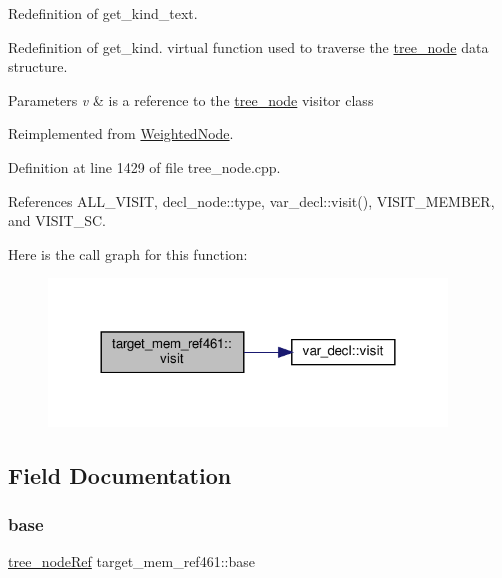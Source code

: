Redefinition of get\+\_\+kind\+\_\+text. 

Redefinition of get\+\_\+kind. virtual function used to traverse the \hyperlink{classtree__node}{tree\+\_\+node} data structure. 
\begin{DoxyParams}{Parameters}
{\em v} & is a reference to the \hyperlink{classtree__node}{tree\+\_\+node} visitor class \\
\hline
\end{DoxyParams}


Reimplemented from \hyperlink{structWeightedNode_a6f976feccb640a60f96475a668314fde}{Weighted\+Node}.



Definition at line 1429 of file tree\+\_\+node.\+cpp.



References A\+L\+L\+\_\+\+V\+I\+S\+IT, decl\+\_\+node\+::type, var\+\_\+decl\+::visit(), V\+I\+S\+I\+T\+\_\+\+M\+E\+M\+B\+ER, and V\+I\+S\+I\+T\+\_\+\+SC.

Here is the call graph for this function\+:
\nopagebreak
\begin{figure}[H]
\begin{center}
\leavevmode
\includegraphics[width=300pt]{dd/d30/structtarget__mem__ref461_af45ee8b7f6831742eb9108a5987d871e_cgraph}
\end{center}
\end{figure}


\subsection{Field Documentation}
\mbox{\label{structtarget__mem__ref461_af31b3c40c53aefda22f12d42c15de264}} 
\subsubsection{\texorpdfstring{base}{base}}
{\footnotesize\ttfamily \hyperlink{tree__node_8hpp_a6ee377554d1c4871ad66a337eaa67fd5}{tree\+\_\+node\+Ref} target\+\_\+mem\+\_\+ref461\+::base}



